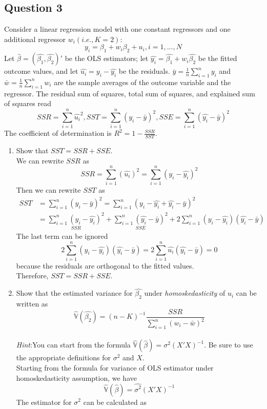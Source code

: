 \documentclass[12pt]{article}
\begin{document}
\begin{flushleft}
\subsection*{Question 3}
Consider a linear regression model with one constant regressors and one additional regressor $w_i(i.e.,K=2)$:
\[
y_i=\beta_1+w_i\beta_2+u_i,i=1,...,N
\]
Let $\hat{\beta}=(\hat{\beta_1},\hat{\beta_2})'$ be the OLS estimators; let $\hat{y_i}=\hat{\beta_1}+w_i\hat{\beta_2}$ be the fitted outcome values, and let $\hat{u_i}=y_i-\hat{y_i}$ be the residuals. $\bar{y}=\frac{1}{n}\sum_{i=1}^n y_i$ and $\bar{w}=\frac{1}{n}\sum_{i=1}^n w_i$ are the sample averages of the outcome variable and the regressor. The residual sum of squares, total sum of squares, and explained sum of squares read 
\[
SSR=\sum_{i=1}^n \hat{u_i}^2, SST=\sum_{i=1}^n (y_i-\bar{y})^2, SSE=\sum_{i=1}^n (\hat{y_i}-\bar{y})^2
\]
The coefficient of determination is $R^2=1-\frac{SSR}{SST}$.\\
\begin{enumerate}
\item Show that $SST=SSR+SSE$.\\
We can rewrite $SSR$ as
\[
SSR=\sum_{i=1}^n (\hat{u_i})^2=\sum_{i=1}^n (y_i-\hat{y_i})^2
\]
Then we can rewrite $SST$ as
\begin{align*}
    SST&=\sum_{i=1}^n (y_i-\bar{y})^2=\sum_{i=1}^n (y_i-\hat{y_i}+\hat{y_i}-\bar{y})^2\\
    &=\underset{SSR}{\sum_{i=1}^n (y_i-\hat{y_i})^2}+\underset{SSE}{\sum_{i=1}^n (\hat{y_i}-\bar{y})^2}+2\sum_{i=1}^n (y_i-\hat{y_i})(\hat{y_i}-\bar{y})
\end{align*}
The last term can be ignored
\[
2\sum_{i=1}^n (y_i-\hat{y_i})(\hat{y_i}-\bar{y})=2\sum_{i=1}^n \hat{u_i}(\hat{y_i}-\bar{y})=0
\]
because the residuals are orthogonal to the fitted values.\\
Therefore, $SST=SSR+SSE$.
\item Show that the estimated variance for $\hat{\beta_2}$ under \textit{homoskedasticity} of $u_i$ can be written as 
\[
\hat{\mathbb{V}}(\hat{\beta_2})=(n-K)^{-1}\frac{SSR}{\sum_{i=1}^n(w_i-\bar{w})^2}
\]
\\
\textit{Hint}:You can start from the formula $\hat{\mathbb{V}}(\hat{\beta})=\sigma^2(X'X)^{-1}.$ Be sure to use the appropriate definitions for $\sigma^2$ and $X$.\\
Starting from the formula for variance of OLS estimator under homoskedasticity assumption, we have 
\[
\hat{\mathbb{V}}(\hat{\beta})=\hat{\sigma^2}(X'X)^{-1}
\]
The estimator for $\sigma^2$ can be calculated as

\end{enumerate}
\end{flushleft}
\end{document}
